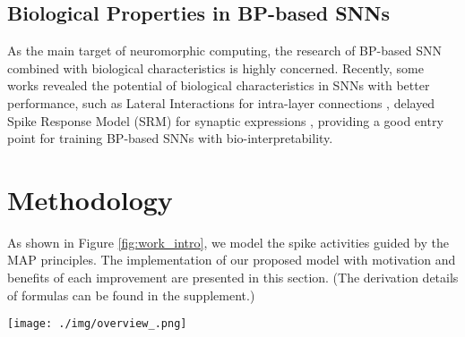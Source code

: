 \documentclass{article}
\begin{document}
\subsection{Biological Properties in BP-based SNNs}
As the main target of neuromorphic computing, the research of BP-based SNN combined with biological characteristics is highly concerned. Recently, some works revealed the potential of biological characteristics in SNNs with better performance, such as Lateral Interactions for intra-layer connections \cite{cheng_lisnn_2020}, delayed Spike Response Model (SRM) for synaptic expressions \cite{shrestha_slayer_2018}, providing a good entry point for training BP-based SNNs with bio-interpretability.









































\section{Methodology}
As shown in Figure \ref{fig:work_intro}, we model the spike activities guided by the MAP principles. The implementation of our proposed model with motivation and benefits of each improvement are presented in this section. (The derivation details of formulas can be found in the supplement.)


\begin{figure*}[htbp]
    \centering
    \texttt{[image: ./img/overview\_.png]}
    \caption{MAP-SNN overview. (a) Modeling neural model mathematically with Dendrites, Soma and Axon. The four variables $I$, $V$, $S$, and $O$  describe the input current, the membrane potential, the spike transmission, and the output current concerning time, respectively. (b) Discretized spike activities with MAP properties. (c) The spatio-temporal feedforward and backward dataflow in the proposed model. Each box of MAP-LIF indicates a certain spatio-temporal iterative state. The solid arrows indicate spatial and temporal feedforward; the red dotted arrows indicate the error backpropagation correspondingly along with the reverse directions of feedforward.
}
    \label{fig:work_intro}
\end{figure*}
\end{document}
